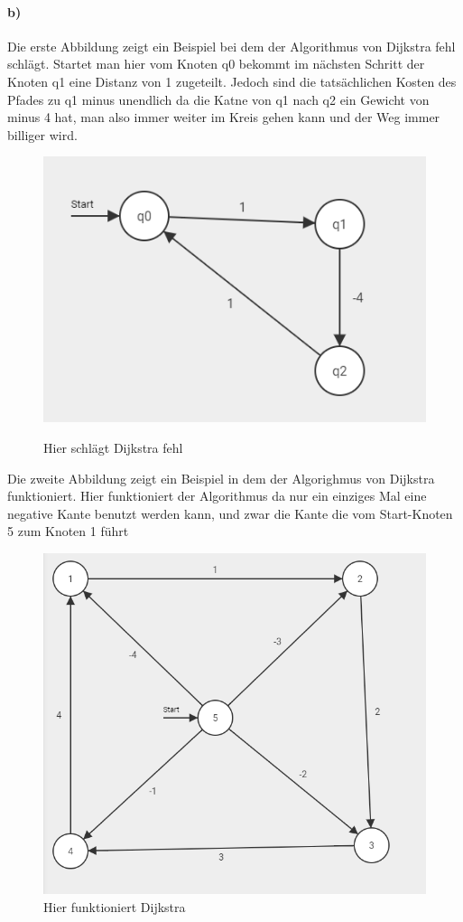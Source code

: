 \documentclass[a4paper]{article}
\begin{document}
\paragraph{b)}
Die erste Abbildung zeigt ein Beispiel bei dem der Algorithmus von Dijkstra fehl schlägt. Startet 
man hier vom Knoten q0 bekommt im nächsten Schritt der Knoten q1 eine Distanz von 1 zugeteilt.
Jedoch sind die tatsächlichen Kosten des Pfades zu q1 minus unendlich da die Katne von q1 nach 
q2 ein Gewicht von minus 4 hat, man also immer weiter im Kreis gehen kann und der Weg immer
billiger wird. \\
\begin{figure}[htb]
\centering
\includegraphics[width=0.9\linewidth]{01.png}
\label{dijkstrabad}
\caption{Hier schlägt Dijkstra fehl}
\end{figure}
Die zweite Abbildung zeigt ein Beispiel in dem der Algorighmus von Dijkstra funktioniert. Hier 
funktioniert der Algorithmus da nur ein einziges Mal eine negative Kante benutzt werden kann, und 
zwar die Kante die vom Start-Knoten 5 zum Knoten 1 führt
\begin{figure}[htb]
\centering
\includegraphics[width=0.9\linewidth]{02.png}
\caption{Hier funktioniert Dijkstra}
\label{fig:dijkstra_good}
\end{figure}
\end{document}
